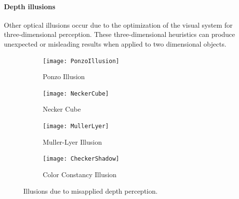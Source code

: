\documentclass[11pt]{isuthesis}\usepackage[]{graphicx}\usepackage[]{color}
\begin{document}
\paragraph{Depth illusions} Other optical illusions occur due to the optimization of the visual system for three-dimensional perception. These three-dimensional heuristics can produce unexpected or misleading results when applied to two dimensional objects. 

\begin{figure}[htbp]\centering
\hfil
\begin{subfigure}[b]{.35\linewidth}\centering
  \texttt{[image: PonzoIllusion]}
  \caption{Ponzo Illusion}\label{fig:Ponzo}
\end{subfigure}\hfill
\begin{subfigure}[b]{.35\linewidth}\centering
  \texttt{[image: NeckerCube]}
  \caption{Necker Cube}\label{fig:NeckerCube}
\end{subfigure}\hfil

\hfil
\begin{subfigure}[b]{.35\linewidth}\centering
  \texttt{[image: MullerLyer]}
  \caption{Muller-Lyer Illusion}\label{fig:MullerLyer}
\end{subfigure}\hfill
\begin{subfigure}[b]{.35\linewidth}\centering
  \texttt{[image: CheckerShadow]}
  \caption{Color Constancy Illusion}\label{fig:ColorConstancy}
\end{subfigure}\hfil

\caption[Depth Illusions]{Illusions due to misapplied depth perception.}\label{fig:DepthIllusions}
\end{figure}
\end{document}
